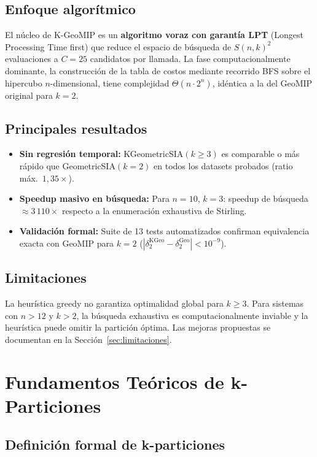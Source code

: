 \documentclass[12pt,letterpaper]{article}
\theoremstyle{definition}
\theoremstyle{remark}
\newcommand{\Stir}[2]{S(#1,#2)}
\newcommand{\BigTheta}[1]{\Theta(#1)}
\begin{document}
\subsection{Enfoque algorítmico}
El núcleo de K-GeoMIP es un \textbf{algoritmo voraz con garantía LPT} (Longest Processing
Time first) que reduce el espacio de búsqueda de $\Stir{n}{k}^2$ evaluaciones a
$C = 25$ candidatos por llamada. La fase computacionalmente dominante, la construcción de
la tabla de costos mediante recorrido BFS sobre el hipercubo $n$-dimensional, tiene
complejidad $\BigTheta{n \cdot 2^n}$, idéntica a la del GeoMIP original para $k = 2$.

\subsection{Principales resultados}
\begin{itemize}
  \item \textbf{Sin regresión temporal:} KGeometricSIA$(k \geq 3)$ es comparable o más
    rápido que GeometricSIA$(k=2)$ en todos los datasets probados (ratio máx.\ $1{,}35\times$).
  \item \textbf{Speedup masivo en búsqueda:} Para $n=10$, $k=3$: speedup de búsqueda
    $\approx 3\,110\times$ respecto a la enumeración exhaustiva de Stirling.
  \item \textbf{Validación formal:} Suite de 13 tests automatizados confirman equivalencia
    exacta con GeoMIP para $k=2$
    ($|\delta_2^{\mathrm{KGeo}} - \delta_2^{\mathrm{Geo}}| < 10^{-9}$).
\end{itemize}

\subsection{Limitaciones}
La heurística greedy no garantiza optimalidad global para $k \geq 3$. Para sistemas con
$n > 12$ y $k > 2$, la búsqueda exhaustiva es computacionalmente inviable y la heurística
puede omitir la partición óptima. Las mejoras propuestas se documentan en la
Sección~\ref{sec:limitaciones}.

\section{Fundamentos Teóricos de k-Particiones}

\subsection{Definición formal de k-particiones}
\end{document}
